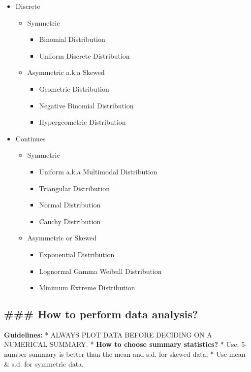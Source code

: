 \documentclass[11pt]{article}
\providecommand{\tightlist}{%
      \setlength{\itemsep}{0pt}\setlength{\parskip}{0pt}}
\begin{document}
\begin{itemize}
\tightlist
\item
  Discrete

  \begin{itemize}
  \tightlist
  \item
    Symmetric

    \begin{itemize}
    \tightlist
    \item
      Binomial Distribution
    \item
      Uniform Discrete Distribution
    \end{itemize}
  \item
    Asymmetric a.k.a Skewed

    \begin{itemize}
    \tightlist
    \item
      Geometric Distribution
    \item
      Negative Binomial Distribution
    \item
      Hypergeometric Distribution
    \end{itemize}
  \end{itemize}
\item
  Continues

  \begin{itemize}
  \tightlist
  \item
    Symmetric

    \begin{itemize}
    \tightlist
    \item
      Uniform a.k.a Multimodal Distribution
    \item
      Triangular Distribution
    \item
      Normal Distribution
    \item
      Cauchy Distribution
    \end{itemize}
  \item
    Asymmetric or Skewed

    \begin{itemize}
    \tightlist
    \item
      Exponential Distribution
    \item
      Lognormal Gamma Weibull Distribution
    \item
      Minimum Extreme Distribution
    \end{itemize}
  \end{itemize}
\end{itemize}

    

    \subsection{\#\#\# How to perform data
analysis?}\label{how-to-perform-data-analysis}

    \textbf{Guidelines:} * ALWAYS PLOT DATA BEFORE DECIDING ON A NUMERICAL
SUMMARY. * \textbf{How to choose summary statistics?} * Use: 5-number
summary is better than the mean and s.d. for skewed data; * Use mean \&
s.d. for symmetric data.


    
    
    
    
\end{document}

